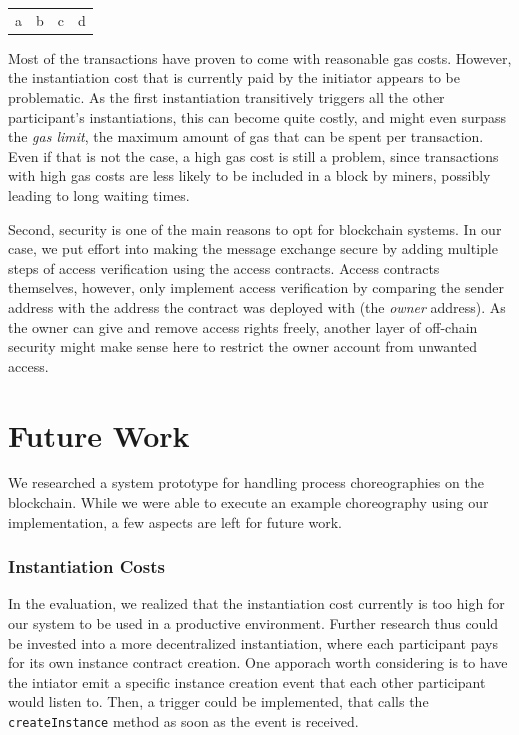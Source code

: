 \documentclass[runningheads]{llncs}
\begin{document}
\begin{tabular}{l|l|l|l}
	a & b & c & d
\end{tabular}

Most of the transactions have proven to come with reasonable gas costs.
However, the instantiation cost that is currently paid by the initiator appears to be problematic.
As the first instantiation transitively triggers all the other participant's instantiations, this can become quite costly, and might even surpass the \textit{gas limit}, the maximum amount of gas that can be spent per transaction.
Even if that is not the case, a high gas cost is still a problem, since transactions with high gas costs are less likely to be included in a block by miners, possibly leading to long waiting times. %

Second, security is one of the main reasons to opt for blockchain systems.
In our case, we put effort into making the message exchange secure by adding multiple steps of access verification using the access contracts.
Access contracts themselves, however, only implement access verification by comparing the sender address with the address the contract was deployed with (the \textit{owner} address).
As the owner can give and remove access rights freely, another layer of off-chain security might make sense here to restrict the owner account from unwanted access.


\section{Future Work}

We researched a system prototype for handling process choreographies on the blockchain.
While we were able to execute an example choreography using our implementation, a few aspects are left for future work.

\subsubsection{Instantiation Costs}

In the evaluation, we realized that the instantiation cost currently is too high for our system to be used in a productive environment.
Further research thus could be invested into a more decentralized instantiation, where each participant pays for its own instance contract creation.
One apporach worth considering is to have the intiator emit a specific instance creation event that each other participant would listen to.
Then, a trigger could be implemented, that calls the \texttt{createInstance} method as soon as the event is received.
\end{document}
